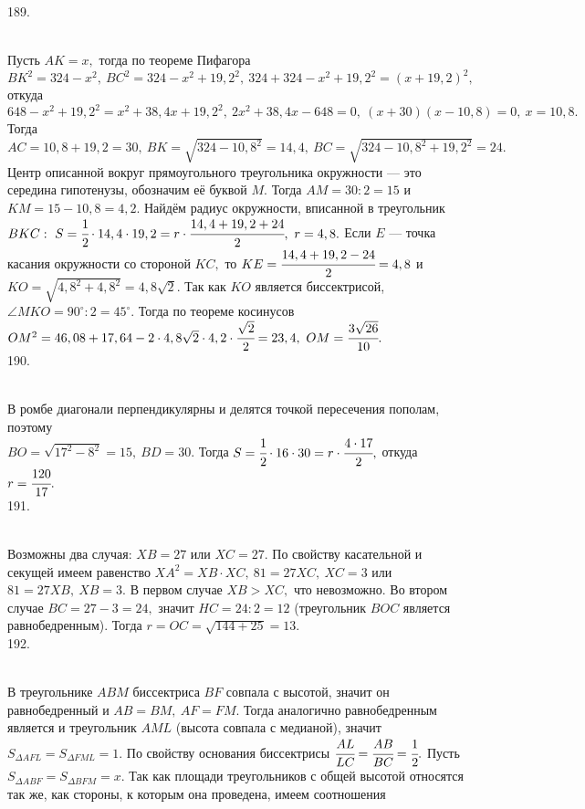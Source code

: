 189. \begin{figure}[ht!]
\end{figure}\\
Пусть $AK=x,$ тогда по теореме Пифагора $BK^2=324-x^2,\ BC^2=324-x^2+19,2^2,\ 324+324-x^2+19,2^2=(x+19,2)^2,$ откуда $648-x^2+19,2^2=x^2+38,4x+19,2^2,\
2x^2+38,4x-648=0,\ (x+30)(x-10,8)=0,\ x=10,8.$ Тогда $AC=10,8+19,2=30,\ BK=\sqrt{324-10,8^2}=14,4,\ BC=\sqrt{324-10,8^2+19,2^2}=24.$ Центр описанной вокруг прямоугольного треугольника окружности --- это середина гипотенузы, обозначим её буквой $M.$ Тогда $AM=30:2=15$ и $KM=15-10,8=4,2.$ Найдём радиус окружности, вписанной в треугольник $BKC:\ S=\cfrac{1}{2}\cdot14,4\cdot19,2=r\cdot\cfrac{14,4+19,2+24}{2},\ r=4,8.$ Если $E$ --- точка касания окружности со стороной $KC,$ то $KE=\cfrac{14,4+19,2-24}{2}=4,8$ и $KO=\sqrt{4,8^2+4,8^2}=4,8\sqrt{2}.$ Так как $KO$ является биссектрисой, $\angle MKO=90^\circ:2=45^\circ.$ Тогда по теореме косинусов $OM^2=46,08+17,64-2\cdot4,8\sqrt{2}\cdot4,2\cdot\cfrac{\sqrt{2}}{2}=23,4,\ OM=\cfrac{3\sqrt{26}}{10}.$\\
190. \begin{figure}[ht!]
\end{figure}\\
В ромбе диагонали перпендикулярны и делятся точкой пересечения пополам, поэтому\\ $BO=\sqrt{17^2-8^2}=15,\ BD=30.$ Тогда $S=\cfrac{1}{2}\cdot16\cdot30=r\cdot\cfrac{4\cdot17}{2},$ откуда $r=\cfrac{120}{17}.$\\
191. \begin{figure}[ht!]
\end{figure}\\
Возможны два случая: $XB=27$ или $XC=27.$ По свойству касательной и секущей имеем равенство $XA^2=XB\cdot XC,\ 81=27XC,\ XC=3$ или $81=27XB,\ XB=3.$ В первом случае $XB>XC,$ что невозможно. Во втором случае $BC=27-3=24,$ значит $HC=24:2=12$ (треугольник $BOC$ является равнобедренным). Тогда $r=OC=\sqrt{144+25}=13.$\\
192. \begin{figure}[ht!]
\end{figure}\\
В треугольнике $ABM$ биссектриса $BF$ совпала с высотой, значит он равнобедренный и $AB=BM,\ AF=FM.$ Тогда аналогично равнобедренным является и треугольник $AML$ (высота совпала с медианой), значит $S_{\Delta AFL}=S_{\Delta FML}=1.$ По свойству основания биссектрисы $\cfrac{AL}{LC}=\cfrac{AB}{BC}=\cfrac{1}{2}.$ Пусть $S_{\Delta ABF}=S_{\Delta BFM}=x.$ Так как площади треугольников с общей высотой относятся так же, как стороны, к которым она проведена, имеем соотношения
